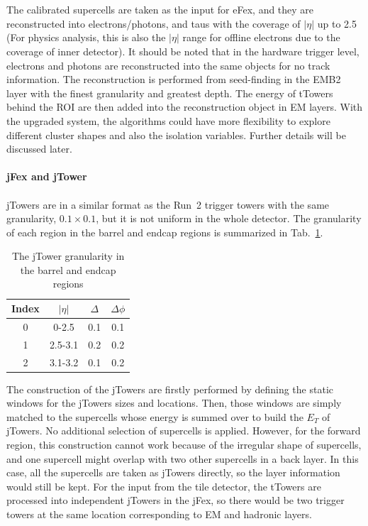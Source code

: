 \noindent
\\
\\The calibrated supercells are taken as the input for eFex, and they are reconstructed into electrons/photons, and taus with the coverage of $|\eta|$ up to 2.5 (For physics analysis, this is also the $|\eta|$ range for offline electrons due to the coverage of inner detector). It should be noted that in the hardware trigger level, electrons and photons are reconstructed into the same objects for no track information. The reconstruction is performed from seed-finding in the EMB2 layer with the finest granularity and greatest depth. The energy of tTowers behind the ROI are then added into the reconstruction object in EM layers. With the upgraded system, the algorithms could have more flexibility to explore different cluster shapes and also the isolation variables. Further details will be discussed later. 
\\
\\{\bf jFex and jTower}
\\
\\jTowers are in a similar format as the Run~2 trigger towers with the same granularity, $0.1\times0.1$, but it is not uniform in the whole detector. The granularity of each region in the barrel and endcap regions is summarized in Tab.~\ref{Tab:granularity_jT}.
\begin{table}[h]
	\caption{The jTower granularity in the barrel and endcap regions}
	\renewcommand{\arraystretch}{1.3}
	\centering
	\begin{tabular}{| c | c | c | c | }
		\hline
		\hline
		Index      &    $|\eta|$        &     $\Delta$     & $\Delta\phi$   \\
		\hline
		0          &     0-2.5          & 0.1                          &  0.1                          \\
		\hline
		1          &     2.5-3.1           & 0.2                          &  0.2                         \\
		\hline
		2      &     3.1-3.2       & 0.1                       &  0.2                       \\
		\hline
		\hline
	\end{tabular}
	\label{Tab:granularity_jT}
\end{table}
\noindent
The construction of the jTowers are firstly performed by defining the static windows for the jTowers sizes and locations. Then, those windows are simply matched to the supercells whose energy is summed over to build the $E_{T}$ of jTowers. No additional selection of supercells is applied. However, for the forward region, this construction cannot work because of the irregular shape of supercells, and one supercell might overlap with two other supercells in a back layer. In this case, all the supercells are taken as jTowers directly, so the layer information would still be kept. For the input from the tile detector, the tTowers are processed into independent jTowers in the jFex, so there would be two trigger towers at the same location corresponding to EM and hadronic layers. 
